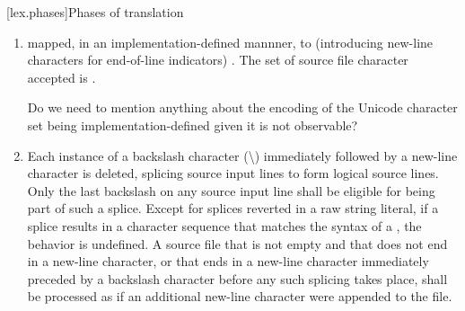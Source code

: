 \documentclass{wg21}
\begin{document}
[lex.phases]{Phases of translation}%

\begin{enumerate}
\item
{}%
 mapped, in an implementation-defined mannner,
to  (introducing new-line characters for end-of-line
indicators) .
The set of  source file character accepted is .


\begin{quoteblock}
Do we need to mention anything about the encoding of the Unicode character set being implementation-defined given it is not observable?
\end{quoteblock}

\item
{}%
Each instance of a backslash character (\textbackslash)
immediately followed by a new-line character is deleted, splicing
 source input lines to form logical source lines. Only the last
backslash on any  source input line shall be eligible for being part
of such a splice.
Except for splices reverted in a raw string literal, if a splice results in
a character sequence that matches the
syntax of a , the behavior is
undefined. A source file that is not empty and that does not end in a new-line
character, or that ends in a new-line character immediately preceded by a
backslash character before any such splicing takes place,
shall be processed as if an additional new-line character were appended
to the file.


\end{enumerate}
\end{document}
